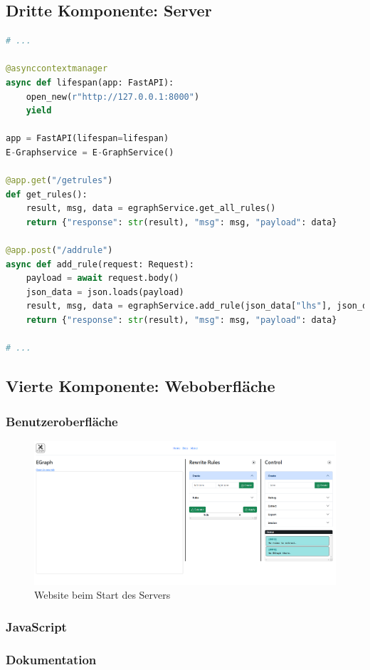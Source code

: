 \subsection{Dritte Komponente: Server}

\begin{lstlisting}[language=Python, caption=Auszug aus der Datei \textit{server.py}]
# ... 

@asynccontextmanager
async def lifespan(app: FastAPI):
    open_new(r"http://127.0.0.1:8000")
    yield

app = FastAPI(lifespan=lifespan)
E-Graphservice = E-GraphService()

@app.get("/getrules")
def get_rules():
    result, msg, data = egraphService.get_all_rules()
    return {"response": str(result), "msg": msg, "payload": data}

@app.post("/addrule")
async def add_rule(request: Request):
    payload = await request.body()
    json_data = json.loads(payload)
    result, msg, data = egraphService.add_rule(json_data["lhs"], json_data["rhs"])
    return {"response": str(result), "msg": msg, "payload": data}

# ... 
\end{lstlisting} 


\subsection{Vierte Komponente: Weboberfläche}


\subsubsection{Benutzeroberfläche}

\afterpage{\clearpage}
\begin{figure}
\centering
\includegraphics[scale=0.45]{../fig/website.png}
\caption{Website beim Start des Servers}
\label{fig:website}
\end{figure}


\subsubsection{JavaScript}

\subsubsection{Dokumentation}









